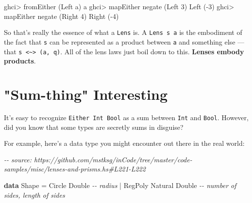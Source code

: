 \documentclass[]{article}
\newenvironment{Shaded}{}{}
\newcommand{\CharTok}[1]{\textcolor[rgb]{0.25,0.44,0.63}{#1}}
\newcommand{\CommentTok}[1]{\textcolor[rgb]{0.38,0.63,0.69}{\textit{#1}}}
\newcommand{\DataTypeTok}[1]{\textcolor[rgb]{0.56,0.13,0.00}{#1}}
\newcommand{\DecValTok}[1]{\textcolor[rgb]{0.25,0.63,0.44}{#1}}
\newcommand{\FunctionTok}[1]{\textcolor[rgb]{0.02,0.16,0.49}{#1}}
\newcommand{\KeywordTok}[1]{\textcolor[rgb]{0.00,0.44,0.13}{\textbf{#1}}}
\newcommand{\NormalTok}[1]{#1}
\newcommand{\OperatorTok}[1]{\textcolor[rgb]{0.40,0.40,0.40}{#1}}
\newcommand{\OtherTok}[1]{\textcolor[rgb]{0.00,0.44,0.13}{#1}}
\begin{document}
\begin{Shaded}
\begin{Highlighting}[]
\NormalTok{ghci}\OperatorTok{\textgreater{}}\NormalTok{ fromEither (}\DataTypeTok{Left} \CharTok{\textquotesingle{}a\textquotesingle{}}\NormalTok{)}
\CharTok{\textquotesingle{}a\textquotesingle{}}
\NormalTok{ghci}\OperatorTok{\textgreater{}}\NormalTok{ mapEither }\FunctionTok{negate}\NormalTok{ (}\DataTypeTok{Left} \DecValTok{3}\NormalTok{)}
\DataTypeTok{Left}\NormalTok{ (}\OperatorTok{{-}}\DecValTok{3}\NormalTok{)}
\NormalTok{ghci}\OperatorTok{\textgreater{}}\NormalTok{ mapEither }\FunctionTok{negate}\NormalTok{ (}\DataTypeTok{Right} \DecValTok{4}\NormalTok{)}
\DataTypeTok{Right}\NormalTok{ (}\OperatorTok{{-}}\DecValTok{4}\NormalTok{)}
\end{Highlighting}
\end{Shaded}

So that's really the essence of what a \texttt{Lens\textquotesingle{}} is. A
\texttt{Lens\textquotesingle{}\ s\ a} is the embodiment of the fact that
\texttt{s} can be represented as a product between \texttt{a} and something else
--- that \texttt{s\ \textless{}\textasciitilde{}\textgreater{}\ (a,\ q)}. All of
the lens laws just boil down to this. \textbf{Lenses embody products}.

\section{"Sum-thing" Interesting}\label{sum-thing-interesting}

It's easy to recognize \texttt{Either\ Int\ Bool} as a sum between \texttt{Int}
and \texttt{Bool}. However, did you know that some types are secretly sums in
disguise?

For example, here's a data type you might encounter out there in the real world:

\begin{Shaded}
\begin{Highlighting}[]
\CommentTok{{-}{-} source: https://github.com/mstksg/inCode/tree/master/code{-}samples/misc/lenses{-}and{-}prisms.hs\#L221{-}L222}

\KeywordTok{data} \DataTypeTok{Shape} \OtherTok{=} \DataTypeTok{Circle}  \DataTypeTok{Double}           \CommentTok{{-}{-} radius}
           \OperatorTok{|} \DataTypeTok{RegPoly} \DataTypeTok{Natural} \DataTypeTok{Double}   \CommentTok{{-}{-} number of sides, length of sides}
\end{Highlighting}
\end{Shaded}
\end{document}
